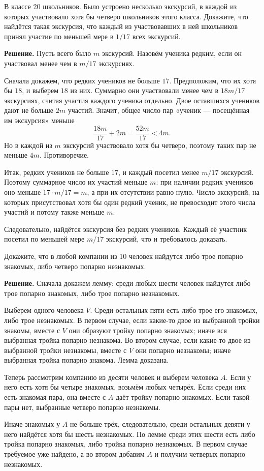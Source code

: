 \begin{problems}
\item В классе 20 школьников. Было устроено несколько экскурсий, в каждой из которых участвовало хотя бы четверо школьников этого класса. Докажите, что найдётся такая экскурсия, что каждый из участвовавших в ней школьников принял участие по меньшей мере в $1/17$ всех экскурсий.
\par\smallskip\noindent\textbf{Решение.} Пусть всего было $m$ экскурсий. Назовём ученика редким, если он участвовал менее чем в $m/17$ экскурсиях.
\par Сначала докажем, что редких учеников не больше $17$. Предположим, что их хотя бы $18$, и выберем $18$ из них. Суммарно они участвовали менее чем в $18m/17$ экскурсиях, считая участия каждого ученика отдельно. Двое оставшихся учеников дают не больше $2m$ участий. Значит, общее число пар «ученик --- посещённая им экскурсия» меньше
\[
\frac{18m}{17}+2m=\frac{52m}{17}<4m.
\]
Но в каждой из $m$ экскурсий участвовало хотя бы четверо, поэтому таких пар не меньше $4m$. Противоречие.
\par Итак, редких учеников не больше $17$, и каждый посетил менее $m/17$ экскурсий. Поэтому суммарное число их участий меньше $m$: при наличии редких учеников оно меньше $17\cdot m/17=m$, а при их отсутствии равно нулю. Число экскурсий, на которых присутствовал хотя бы один редкий ученик, не превосходит этого числа участий и потому также меньше $m$.
\par Следовательно, найдётся экскурсия без редких учеников. Каждый её участник посетил по меньшей мере $m/17$ экскурсий, что и требовалось доказать.\par

\item Докажите, что в любой компании из 10 человек найдутся либо трое попарно знакомых, либо четверо попарно незнакомых.
\par\smallskip\noindent\textbf{Решение.} Сначала докажем лемму: среди любых шести человек найдутся либо трое попарно знакомых, либо трое попарно незнакомых.
\par Выберем одного человека $V$. Среди остальных пяти есть либо трое его знакомых, либо трое незнакомых. В первом случае, если какие-то двое из выбранной тройки знакомы, вместе с $V$ они образуют тройку попарно знакомых; иначе вся выбранная тройка попарно незнакома. Во втором случае, если какие-то двое из выбранной тройки незнакомы, вместе с $V$ они попарно незнакомы; иначе выбранная тройка попарно знакома. Лемма доказана.
\par Теперь рассмотрим компанию из десяти человек и выберем человека $A$. Если у него есть хотя бы четыре знакомых, возьмём любых четырёх. Если среди них есть знакомая пара, она вместе с $A$ даёт тройку попарно знакомых. Если такой пары нет, выбранные четверо попарно незнакомы.
\par Иначе знакомых у $A$ не больше трёх, следовательно, среди остальных девяти у него найдётся хотя бы шесть незнакомых. По лемме среди этих шести есть либо тройка попарно знакомых, либо тройка попарно незнакомых. В первом случае требуемое уже найдено, а во втором добавим $A$ и получим четверых попарно незнакомых.\par


\end{problems}

